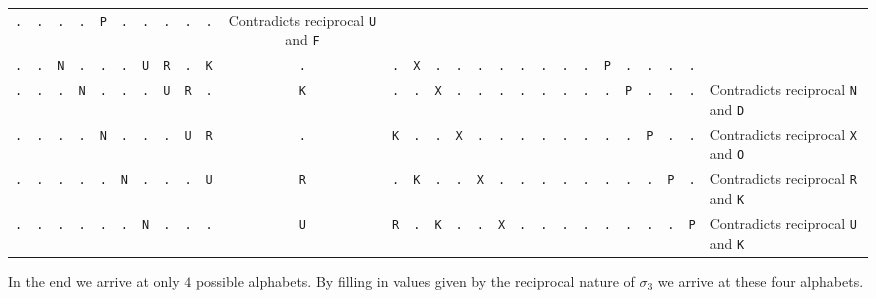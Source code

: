 \begin{center}
{\begin{tabular}{|*{26}{c|}l|}
      \texttt{.} & \texttt{.} & \texttt{.} & \texttt{.} &
      \texttt{P} & \texttt{.} & \texttt{.} & \texttt{.} &
      \texttt{.} & \texttt{.} & \;\;Contradicts reciprocal
      \texttt{U} and \texttt{F} \\
      \texttt{.} & \texttt{.} & \texttt{N} & \texttt{.} &
      \texttt{.} & \texttt{.} & \texttt{U} & \texttt{R} &
      \texttt{.} & \texttt{K} & \texttt{.} & \texttt{.} &
      \texttt{X} & \texttt{.} & \texttt{.} & \texttt{.} &
      \texttt{.} & \texttt{.} & \texttt{.} & \texttt{.} &
      \texttt{.} & \texttt{P} & \texttt{.} & \texttt{.} &
      \texttt{.} & \texttt{.} & \;\;{\bf{Possible}}
      \\
      \texttt{.} & \texttt{.} & \texttt{.} & \texttt{N} &
      \texttt{.} & \texttt{.} & \texttt{.} & \texttt{U} &
      \texttt{R} & \texttt{.} & \texttt{K} & \texttt{.} &
      \texttt{.} & \texttt{X} & \texttt{.} & \texttt{.} &
      \texttt{.} & \texttt{.} & \texttt{.} & \texttt{.} &
      \texttt{.} & \texttt{.} & \texttt{P} & \texttt{.} &
      \texttt{.} & \texttt{.} & \;\;Contradicts reciprocal
      \texttt{N} and \texttt{D} \\
      \texttt{.} & \texttt{.} & \texttt{.} & \texttt{.} &
      \texttt{N} & \texttt{.} & \texttt{.} & \texttt{.} &
      \texttt{U} & \texttt{R} & \texttt{.} & \texttt{K} &
      \texttt{.} & \texttt{.} & \texttt{X} & \texttt{.} &
      \texttt{.} & \texttt{.} & \texttt{.} & \texttt{.} &
      \texttt{.} & \texttt{.} & \texttt{.} & \texttt{P} &
      \texttt{.} & \texttt{.} & \;\;Contradicts reciprocal
      \texttt{X} and \texttt{O} \\
      \texttt{.} & \texttt{.} & \texttt{.} & \texttt{.} &
      \texttt{.} & \texttt{N} & \texttt{.} & \texttt{.} &
      \texttt{.} & \texttt{U} & \texttt{R} & \texttt{.} &
      \texttt{K} & \texttt{.} & \texttt{.} & \texttt{X} &
      \texttt{.} & \texttt{.} & \texttt{.} & \texttt{.} &
      \texttt{.} & \texttt{.} & \texttt{.} & \texttt{.} &
      \texttt{P} & \texttt{.} & \;\;Contradicts reciprocal
      \texttt{R} and \texttt{K} \\
      \texttt{.} & \texttt{.} & \texttt{.} & \texttt{.} &
      \texttt{.} & \texttt{.} & \texttt{N} & \texttt{.} &
      \texttt{.} & \texttt{.} & \texttt{U} & \texttt{R} &
      \texttt{.} & \texttt{K} & \texttt{.} & \texttt{.} &
      \texttt{X} & \texttt{.} & \texttt{.} & \texttt{.} &
      \texttt{.} & \texttt{.} & \texttt{.} & \texttt{.} &
      \texttt{.} & \texttt{P} & \;\;Contradicts reciprocal
      \texttt{U} and \texttt{K} \\
      \hline
  \end{tabular}}
\end{center}
\noindent In the end we arrive at only $4$ possible alphabets. By
filling in values given by the reciprocal nature of $\sigma_3$ we
arrive at these four alphabets.
\setlength{\tabcolsep}{3pt}
\renewcommand{\arraystretch}{1.1}

